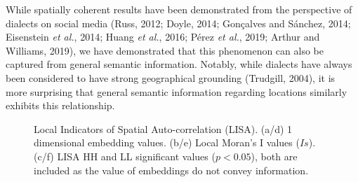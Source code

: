 \documentclass[
]{article}
\begin{document}
While spatially coherent results have been demonstrated from the
perspective of dialects on social media (Russ, 2012; Doyle, 2014;
Gonçalves and Sánchez, 2014; Eisenstein \emph{et al.}, 2014; Huang
\emph{et al.}, 2016; Pérez \emph{et al.}, 2019; Arthur and Williams,
2019), we have demonstrated that this phenomenon can also be captured
from general semantic information. Notably, while dialects have always
been considered to have strong geographical grounding (Trudgill, 2004),
it is more surprising that general semantic information regarding
locations similarly exhibits this relationship.

\begin{figure}


\caption{\label{fig-lisa}Local Indicators of Spatial Auto-correlation
(LISA). (a/d) 1 dimensional embedding values. (b/e) Local Moran's I
values (\(Is\)). (c/f) LISA HH and LL significant values (\(p<0.05\)),
both are included as the value of embeddings do not convey information.}

\end{figure}%
\end{document}
